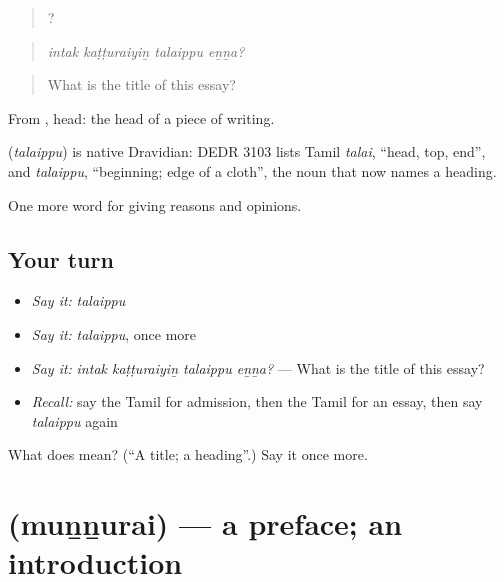 \begin{quote}
   ?
\end{quote}

\begin{quote}
\emph{intak kaṭṭuraiyiṉ talaippu eṉṉa?}
\end{quote}

\begin{quote}
What is the title of this essay?
\end{quote}

From , head: the head of a piece of writing.

\begin{cousinweb}
\textbf{} (\emph{talaippu}) is native Dravidian: DEDR 3103 lists Tamil \emph{talai}, \textquotedblleft{}head, top, end\textquotedblright{}, and \emph{talaippu}, \textquotedblleft{}beginning; edge of a cloth\textquotedblright{}, the noun that now names a heading.
\end{cousinweb}

\begin{grammarlens}[title={What you've built}]
One more word for giving reasons and opinions.
\end{grammarlens}

\subsection*{Your turn}
\begin{itemize}
\raggedright
  \item \emph{Say it:} \emph{talaippu}
  \item \emph{Say it:} \emph{talaippu}, once more
  \item \emph{Say it:} \emph{intak kaṭṭuraiyiṉ talaippu eṉṉa?} — What is the title of this essay?
  \item \emph{Recall:} say the Tamil for admission, then the Tamil for an essay, then say \emph{talaippu} again
\end{itemize}

\begin{tcolorbox}[breakable,colback=teal!4,colframe=teal!35!black,title={Before you move on}]
What does  mean? (\textquotedblleft{}A title; a heading\textquotedblright{}.) Say it once more.
\end{tcolorbox}
\section[\texorpdfstring{\ta{முன்னுரை} (muṉṉurai)}{முன்னுரை (muṉṉurai)}]{ (muṉṉurai) — a preface; an introduction}

